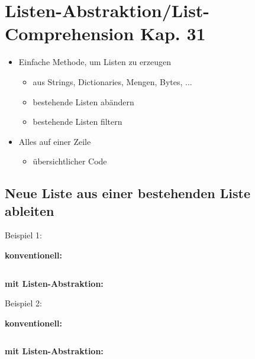 
\section[Listen-Abstraktion/List-Comprehension]{Listen-Abstraktion/List-Comprehension \tiny{Kap. 31}}
\begin{itemize}
	\item Einfache Methode, um Listen zu erzeugen
	\begin{itemize}
		\item aus Strings, Dictionaries, Mengen, Bytes, ...
		\item bestehende Listen abändern
		\item bestehende Listen filtern
	\end{itemize}
	\item Alles auf einer Zeile
	\begin{itemize}
		\item übersichtlicher Code
	\end{itemize}
\end{itemize}

\subsection{Neue Liste aus einer bestehenden Liste ableiten}

Beispiel 1:\\
\begin{minipage}[t]{0.49\textwidth}
	\textbf{konventionell:}
	
\end{minipage}
\begin{minipage}[t]{0.02\textwidth} $ \quad $\end{minipage}
\begin{minipage}[t]{0.49\textwidth}
	\textbf{mit Listen-Abstraktion:}
	
\end{minipage}

Beispiel 2:\\
\begin{minipage}[t]{0.49\textwidth}
	\textbf{konventionell:}
	
\end{minipage}
\begin{minipage}[t]{0.02\textwidth} $ \quad $\end{minipage}
\begin{minipage}[t]{0.49\textwidth}
	\textbf{mit Listen-Abstraktion:}
	
\end{minipage}

